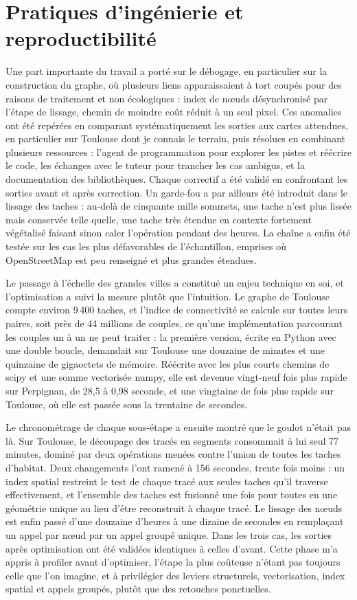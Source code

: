 \documentclass[a4paper,12pt]{report}
\begin{document}
\section{Pratiques d'ingénierie et reproductibilité}
Une part importante du travail a porté sur le débogage, en particulier sur la construction du graphe, où plusieurs liens apparaissaient à tort coupés pour des raisons de traitement et non écologiques : index de nœuds désynchronisé par l'étape de lissage, chemin de moindre coût réduit à un seul pixel. Ces anomalies ont été repérées en comparant systématiquement les sorties aux cartes attendues, en particulier sur Toulouse dont je connais le terrain, puis résolues en combinant plusieurs ressources : l'agent de programmation pour explorer les pistes et réécrire le code, les échanges avec le tuteur pour trancher les cas ambigus, et la documentation des bibliothèques. Chaque correctif a été validé en confrontant les sorties avant et après correction. Un garde-fou a par ailleurs été introduit dans le lissage des taches : au-delà de cinquante mille sommets, une tache n'est plus lissée mais conservée telle quelle, une tache très étendue en contexte fortement végétalisé faisant sinon caler l'opération pendant des heures. La chaîne a enfin été testée sur les cas les plus défavorables de l'échantillon, emprises où OpenStreetMap est peu renseigné et plus grandes étendues.
 
Le passage à l'échelle des grandes villes a constitué un enjeu technique en soi, et l'optimisation a suivi la mesure plutôt que l'intuition. Le graphe de Toulouse compte environ 9\,400 taches, et l'indice de connectivité se calcule sur toutes leurs paires, soit près de 44 millions de couples, ce qu'une implémentation parcourant les couples un à un ne peut traiter : la première version, écrite en Python avec une double boucle, demandait sur Toulouse une douzaine de minutes et une quinzaine de gigaoctets de mémoire. Réécrite avec les plus courts chemins de scipy et une somme vectorisée numpy, elle est devenue vingt-neuf fois plus rapide sur Perpignan, de 28,5 à 0,98 seconde, et une vingtaine de fois plus rapide sur Toulouse, où elle est passée sous la trentaine de secondes.
 
Le chronométrage de chaque sous-étape a ensuite montré que le goulot n'était pas là. Sur Toulouse, le découpage des tracés en segments consommait à lui seul 77 minutes, dominé par deux opérations menées contre l'union de toutes les taches d'habitat. Deux changements l'ont ramené à 156 secondes, trente fois moins : un index spatial restreint le test de chaque tracé aux seules taches qu'il traverse effectivement, et l'ensemble des taches est fusionné une fois pour toutes en une géométrie unique au lieu d'être reconstruit à chaque tracé. Le lissage des nœuds est enfin passé d'une douzaine d'heures à une dizaine de secondes en remplaçant un appel par nœud par un appel groupé unique. Dans les trois cas, les sorties après optimisation ont été validées identiques à celles d'avant. Cette phase m'a appris à profiler avant d'optimiser, l'étape la plus coûteuse n'étant pas toujours celle que l'on imagine, et à privilégier des leviers structurels, vectorisation, index spatial et appels groupés, plutôt que des retouches ponctuelles.
\end{document}
